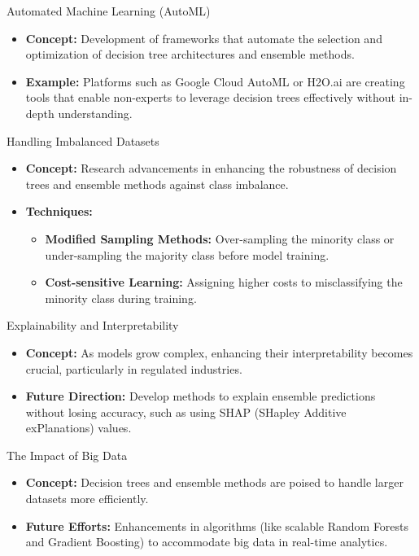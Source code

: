 \documentclass[aspectratio=169]{beamer}
\begin{document}
\begin{frame}[fragile]{Automated Machine Learning (AutoML)}
    \begin{itemize}
        \item \textbf{Concept:} Development of frameworks that automate the selection and optimization of decision tree architectures and ensemble methods.
        \item \textbf{Example:} Platforms such as Google Cloud AutoML or H2O.ai are creating tools that enable non-experts to leverage decision trees effectively without in-depth understanding.
    \end{itemize}
\end{frame}

\begin{frame}[fragile]{Handling Imbalanced Datasets}
    \begin{itemize}
        \item \textbf{Concept:} Research advancements in enhancing the robustness of decision trees and ensemble methods against class imbalance.
        \item \textbf{Techniques:}
            \begin{itemize}
                \item \textbf{Modified Sampling Methods:} Over-sampling the minority class or under-sampling the majority class before model training.
                \item \textbf{Cost-sensitive Learning:} Assigning higher costs to misclassifying the minority class during training.
            \end{itemize}
    \end{itemize}
\end{frame}

\begin{frame}[fragile]{Explainability and Interpretability}
    \begin{itemize}
        \item \textbf{Concept:} As models grow complex, enhancing their interpretability becomes crucial, particularly in regulated industries.
        \item \textbf{Future Direction:} Develop methods to explain ensemble predictions without losing accuracy, such as using SHAP (SHapley Additive exPlanations) values.
    \end{itemize}
\end{frame}

\begin{frame}[fragile]{The Impact of Big Data}
    \begin{itemize}
        \item \textbf{Concept:} Decision trees and ensemble methods are poised to handle larger datasets more efficiently.
        \item \textbf{Future Efforts:} Enhancements in algorithms (like scalable Random Forests and Gradient Boosting) to accommodate big data in real-time analytics.
    \end{itemize}
\end{frame}
\end{document}
